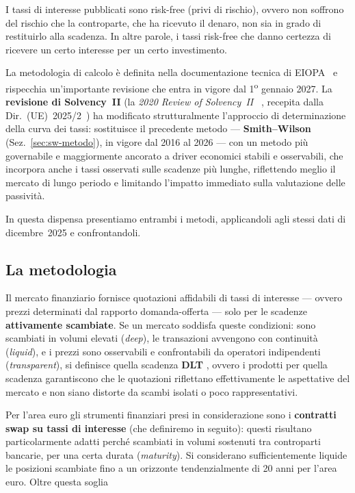 \documentclass[11pt,a4paper]{article}
\theoremstyle{plain}
\theoremstyle{definition}
\theoremstyle{remark}
\newcommand{\FSP}{\mathrm{FSP}}
\begin{document}
I tassi di interesse pubblicati sono risk-free (privi di rischio), ovvero
non soffrono del rischio che la controparte, che ha ricevuto il denaro, 
non sia in grado di restituirlo alla scadenza. 
In altre parole, i tassi risk-free che danno certezza di ricevere un certo interesse per un certo investimento.

La metodologia
di calcolo \`e definita nella documentazione tecnica di EIOPA~\cite{eiopa2026} e rispecchia
un'importante revisione che entra in vigore dal 1\textsuperscript{o} gennaio 2027. 
La \textbf{revisione di Solvency~II} (la \emph{2020 Review of Solvency~II}%
~\cite{eiopa2020opinion}, recepita dalla Dir.~(UE)~2025/2~\cite{dir2025}) 
ha modificato strutturalmente l'approccio di determinazione della curva dei tassi: sostituisce
il precedente metodo --- \textbf{Smith--Wilson} (Sez.~\ref{sec:sw-metodo}), in vigore dal 2016
al 2026 --- con un metodo
più governabile e maggiormente ancorato a driver economici stabili e osservabili, che
incorpora anche i tassi osservati sulle scadenze pi\`u lunghe, riflettendo meglio il mercato di
lungo periodo e limitando l'impatto immediato sulla valutazione delle passivit\`a.

In questa dispensa presentiamo entrambi i metodi, applicandoli agli stessi dati di dicembre~2025 e confrontandoli.

\subsection{La metodologia}

Il mercato finanziario fornisce quotazioni affidabili di tassi di interesse --- ovvero prezzi
determinati dal rapporto domanda-offerta --- solo per le scadenze
\textbf{attivamente scambiate}. Se un mercato soddisfa queste condizioni: sono scambiati in volumi elevati (\emph{deep}), le
transazioni avvengono con continuità (\emph{liquid}),
e i prezzi sono osservabili e confrontabili da operatori indipendenti (\emph{transparent}), 
 si definisce quella scadenza \textbf{DLT} , ovvero i prodotti per quella scadenza garantiscono che le
quotazioni riflettano effettivamente le aspettative del mercato e non siano distorte da
scambi isolati o poco rappresentativi.

Per l'area euro gli strumenti finanziari presi in considerazione sono i \textbf{contratti swap su
tassi di interesse} (che definiremo in seguito): questi risultano
particolarmente adatti perché scambiati in volumi sostenuti tra controparti bancarie, per una certa
durata (\emph{maturity}). Si considerano sufficientemente liquide le posizioni scambiate fino a un
orizzonte tendenzialmente di 20 anni per l'area euro. Oltre questa soglia 
\end{document}
